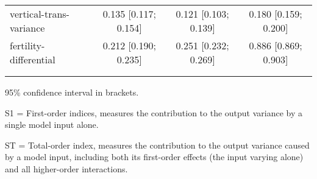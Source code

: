 \begin{table}[htp]
\begin{threeparttable}
\begin{tabular}{lccc}
	  \hspace{1.5em} vertical-trans-variance & 0.135 [0.117; 0.154]   & 0.121 [0.103; 0.139]   & 0.180 [0.159; 0.200] \\
	  \hspace{1.5em} fertility-differential & 0.212 [0.190; 0.235]   & 0.251 [0.232; 0.269]   & 0.886 [0.869; 0.903] \\
	 \\
\addlinespace
\hline
\end{tabular}
\begin{tablenotes}
\scriptsize
\item 95\% confidence interval in brackets.
\item S1 = First-order indices,  measures the contribution to the output variance by a single model input alone.
\item ST = Total-order index, measures the contribution to the output variance caused by a model input, including both its first-order effects (the input varying alone) and all higher-order interactions.
\end{tablenotes}
\end{threeparttable}
\end{table}